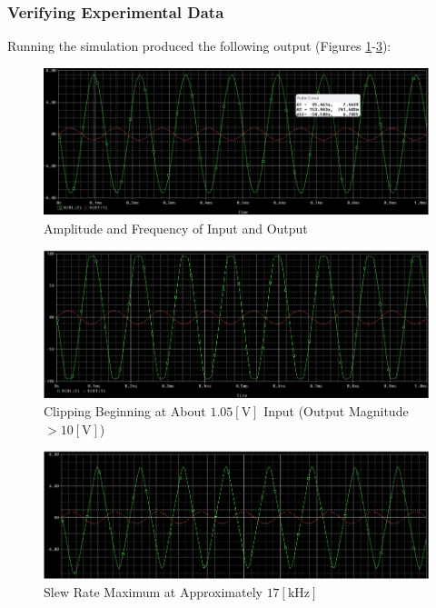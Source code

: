 \documentclass[
	letterpaper, %
	10pt, %
]{CSUniSchoolLabReport}
\begin{document}
\subsubsection{Verifying Experimental Data}

Running the simulation produced the following output (Figures \ref{fig:9}-\ref{fig:11}):

\begin{figure}[H]
  \centering
  \includegraphics[width=.9\textwidth]{Figures/L1D1.png}
  \caption{Amplitude and Frequency of Input and Output}
  \label{fig:9}
\end{figure}

\begin{figure}[H]
  \centering
  \includegraphics[width=.9\textwidth]{Figures/L1D2.png}
  \caption{Clipping Beginning at About $1.05[\si{\volt}]$ Input (Output Magnitude $>10[\si{\volt}]$)}
  \label{fig:10}
\end{figure}

\begin{figure}[H]
  \centering
  \includegraphics[width=.9\textwidth]{Figures/L1D3.png}
  \caption{Slew Rate Maximum at Approximately $17[\si{\kilo\hertz}]$}
  \label{fig:11}
\end{figure}
\end{document}
